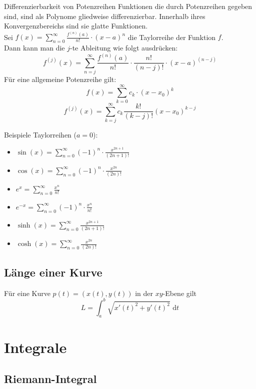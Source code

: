 \documentclass[a4paper,fontsize = 7pt]{scrartcl}
\def\sumn{\sum_{n=0}^\infty}
\begin{document}
\begin{subbox}{Differenzierbarkeit von Potenzreihen}
  \vspace{-4pt}
  Funktionen die durch Potenzreihen gegeben sind, sind als Polynome gliedweise differenzierbar. Innerhalb ihres Konvergenzbereichs sind sie glatte Funktionen.
  \\Sei $f(x) = \sumn \frac{f^{(n)}(a)}{n!}\cdot(x-a)^n$ die Taylorreihe der Funktion $f$.
  \\Dann kann man die $j$-te Ableitung wie folgt ausdrücken:
  $$f^{(j)}(x) = \sum_{n = j}^{\infty} \frac{f^{(n)}(a)}{n!} \cdot \frac{n!}{(n-j)!} \cdot (x - a)^{(n-j)}$$
  Für eine allgemeine Potenzreihe gilt:
  $$f(x) = \sum_{k = 0}^{\infty} c_k\cdot(x-x_0)^k$$ 
  $$ f^{(j)}(x) = \sum_{k = j}^{\infty} c_k \frac{k!}{(k-j)!}(x-x_0)^{k-j}$$
  \vspace{-12pt}
\end{subbox}

Beispiele Taylorreihen ($a = 0$):
\begin{itemize}
 \item $\sin(x) = \sumn (-1)^n \cdot \frac{x^{2n+1}}{(2n+1)!}$
 \item $\cos(x) = \sumn (-1)^n \cdot \frac{x^{2n}}{(2n)!}$
 \item $e^x = \sumn \frac{x^n}{n!}$
 \item $e^{-x} = \sumn (-1)^n \cdot \frac{x^n}{n!}$
 \item $\sinh(x) = \sumn \frac{x^{2n+1}}{(2n+1)!}$
 \item $\cosh(x) = \sumn \frac{x^{2n}}{(2n)!}$
\end{itemize}

\subsection{Länge einer Kurve}
Für eine Kurve $p(t) = (x(t), y(t))$ in der $xy$-Ebene gilt 
$$L = \int_a^b \sqrt{x'(t)^2+ y'(t)^2} \text{ d}t$$

\section{Integrale}

\subsection{Riemann-Integral}
\end{document}
